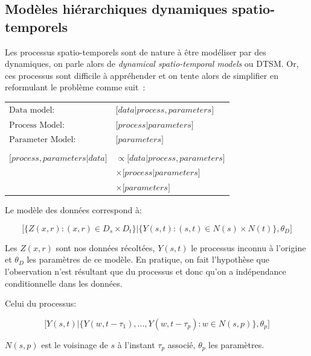 \subsection{Modèles hiérarchiques dynamiques spatio-temporels}

Les processus spatio-temporels sont de nature à être modéliser par des dynamiques, on parle alors de \textit{dynamical spatio-temporal models} ou DTSM. Or, ces processus sont difficile à appréhender et on tente alors de simplifier en reformulant le problème comme suit~\cite{wikle1998hierarchical}:

\begin{tabular}{ll}

    $\text{Data model}:$ & $ \lbrack data|process, parameters\rbrack $ \\
    $\text{Process Model}:$ & $ \lbrack process|parameters\rbrack $ \\
    $\text{Parameter Model}:$ & $ \lbrack parameters\rbrack $ \\
    \\
    $ \lbrack process, parameters|data \rbrack $ & $\propto \lbrack data|process, parameters\rbrack $ \\
    & $ \times \lbrack process|parameters\rbrack $ \\
    & $ \times \lbrack parameters\rbrack $

\end{tabular}

Le modèle des données correspond à:

\begin{equation}
    \lbrack \{ Z(x, r): (x, r) \in D_{s} \times D_{t}\} | \{ Y(s, t): (s, t) \in N(s) \times N(t) \}, \theta_{D} \rbrack
\end{equation}

Les $Z(x, r)$ sont nos données récoltées, $Y(s, t)$ le processus inconnu à l'origine et $\theta_{D}$ les paramètres de ce modèle. En pratique, on fait l'hypothèse que l'observation n'est résultant que du processus et donc qu'on a indépendance conditionnelle dans les données.

Celui du processus:

\begin{equation}
    \lbrack Y(s, t) | \{ Y(w, t - \tau_{1}), ..., Y(w, t - \tau_{p}): w \in N(s, p) \}, \theta_{p} \rbrack
\end{equation}

$ N(s, p) $ est le voisinage de $s$ à l'instant $\tau_{p}$ associé, $\theta_{p}$ les paramètres.


